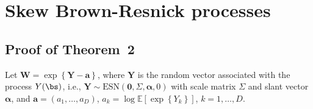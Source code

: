 \documentclass[12pt]{article}
\begin{document}
\section{Skew Brown-Resnick processes}
\label{sec:skew-log-normal_appendix}

\subsection{Proof of Theorem~2}

Let $\bm W = \exp\left\{ \bm Y - \bm a \right\}$, where $\bm Y$ is the random vector associated with the process $Y(\bs)$, i.e., $\bm Y \sim \text{ESN}(\bm 0,\Sigma,\bm\alpha,0)$ with scale matrix $\Sigma$ and slant vector $\bm \alpha$, and $\bm a = (a_1, \ldots, a_D)$, $a_k=\log \mathbb E\left[\exp\left\{Y_k \right\}\right]$, $k=1, \ldots, D$. 
\end{document}
